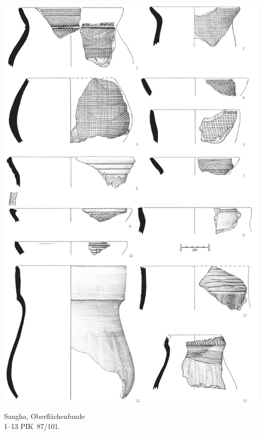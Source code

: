 \begin{pl}[H]
	\includegraphics{plt/Taf51.pdf}
	\vspace{.75em}\caption{\mbox{Sangha}, Oberflächenfunde \\ 1--13 PIK~87/101.}
	\label{pl:51}
\end{pl}

